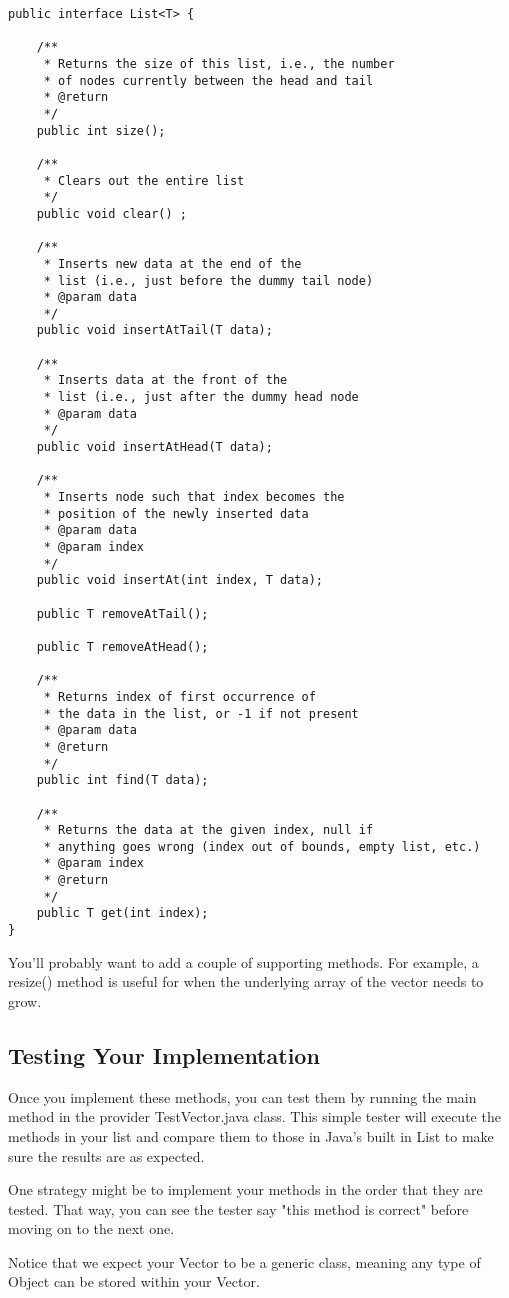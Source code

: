 \documentclass[paper=a4, fontsize=11pt, parskip=full]{scrartcl} %
\numberwithin{equation}{section} %
\numberwithin{figure}{section} %
\numberwithin{table}{section} %
\begin{document}
\begin{lstlisting}
public interface List<T> {

	/**
	 * Returns the size of this list, i.e., the number
	 * of nodes currently between the head and tail
	 * @return
	 */
	public int size();

	/**
	 * Clears out the entire list
	 */
	public void clear() ;

	/**
	 * Inserts new data at the end of the
	 * list (i.e., just before the dummy tail node)
	 * @param data
	 */
	public void insertAtTail(T data);

	/**
	 * Inserts data at the front of the
	 * list (i.e., just after the dummy head node
	 * @param data
	 */
	public void insertAtHead(T data);

	/**
	 * Inserts node such that index becomes the
	 * position of the newly inserted data
	 * @param data
	 * @param index
	 */
	public void insertAt(int index, T data);

	public T removeAtTail();

	public T removeAtHead();

	/**
	 * Returns index of first occurrence of
	 * the data in the list, or -1 if not present
	 * @param data
	 * @return
	 */
	public int find(T data);

	/**
	 * Returns the data at the given index, null if
	 * anything goes wrong (index out of bounds, empty list, etc.)
	 * @param index
	 * @return
	 */
	public T get(int index);
}
\end{lstlisting}

You'll probably want to add a couple of supporting methods. For example, a resize() method is useful for when the underlying array of the vector needs to grow.

\subsection{Testing Your Implementation}

Once you implement these methods, you can test them by running the main method in the provider TestVector.java class. This simple tester will execute the methods in your list and compare them to those in Java's built in List to make sure the results are as expected.

One strategy might be to implement your methods in the order that they are tested. That way, you can see the tester say "this method is correct" before moving on to the next one.

Notice that we expect your Vector to be a generic class, meaning any type of Object can be stored within your Vector.
\end{document}
